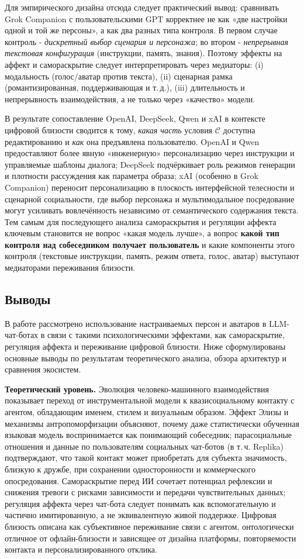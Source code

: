 \documentclass[areasetadvanced]{scrartcl}
\begin{document}
  Для эмпирического дизайна отсюда следует практический вывод: сравнивать Grok Companion с пользовательскими GPT корректнее не как «две настройки одной и той же персоны», а как два разных типа контроля. В первом случае контроль - \emph{дискретный выбор сценария и персонажа}; во втором - \emph{непрерывная текстовая конфигурация} (инструкции, память, знания). Поэтому эффекты на аффект и самораскрытие следует интерпретировать через медиаторы: (i) модальность (голос/аватар против текста), (ii) сценарная рамка (романтизированная, поддерживающая и т.\,д.), (iii) длительность и непрерывность взаимодействия, а не только через «качество» модели.
  
  
  В результате сопоставление OpenAI, DeepSeek, Qwen и xAI в контексте цифровой близости сводится к тому, \emph{какая часть} условия $\mathcal{C}$ доступна редактированию и \emph{как} она предъявлена пользователю. OpenAI и Qwen предоставляют более явную «инженерную» персонализацию через инструкции и управляемые шаблоны диалога; DeepSeek подчёркивает роль режимов генерации и плотности рассуждения как параметра образа; xAI (особенно в Grok Companion) переносит персонализацию в плоскость интерфейсной телесности и сценарной социальности, где выбор персонажа и мультимодальное посредование могут усиливать вовлечённость независимо от семантического содержания текста. Тем самым для последующего анализа самораскрытия и регуляции аффекта ключевым становится не вопрос «какая модель лучше», а вопрос \textbf{какой тип контроля над собеседником получает пользователь} и какие компоненты этого контроля (текстовые инструкции, память, режим ответа, голос, аватар) выступают медиаторами переживания близости.
  \subsection{Выводы}

  В работе рассмотрено использование настраиваемых персон и аватаров в LLM-чат-ботах в связи с такими психологическими эффектами, как самораскрытие, регуляция аффекта и переживание цифровой близости. Ниже сформулированы основные выводы по результатам теоретического анализа, обзора архитектур и сравнения экосистем.

  \textbf{Теоретический уровень.} Эволюция человеко-машинного взаимодействия показывает переход от инструментальной модели к квазисоциальному контакту с агентом, обладающим именем, стилем и визуальным образом. Эффект Элизы и механизмы антропоморфизации объясняют, почему даже статистически обученная языковая модель воспринимается как понимающий собеседник; парасоциальные отношения и данные по пользователям социальных чат-ботов (в т.\,ч. Replika) подтверждают, что такой контакт может приобретать для субъекта значимость, близкую к дружбе, при сохранении односторонности и коммерческого опосредования. Самораскрытие перед ИИ сочетает потенциал рефлексии и снижения тревоги с рисками зависимости и передачи чувствительных данных; регуляция аффекта через чат-бота следует понимать как вспомогательную и частично имитированную, а не эквивалентную живой поддержке. Цифровая близость описана как субъективное переживание связи с агентом, онтологически отличное от офлайн-близости и зависящее от дизайна платформы, повторяемости контакта и персонализированного отклика.
\end{document}
